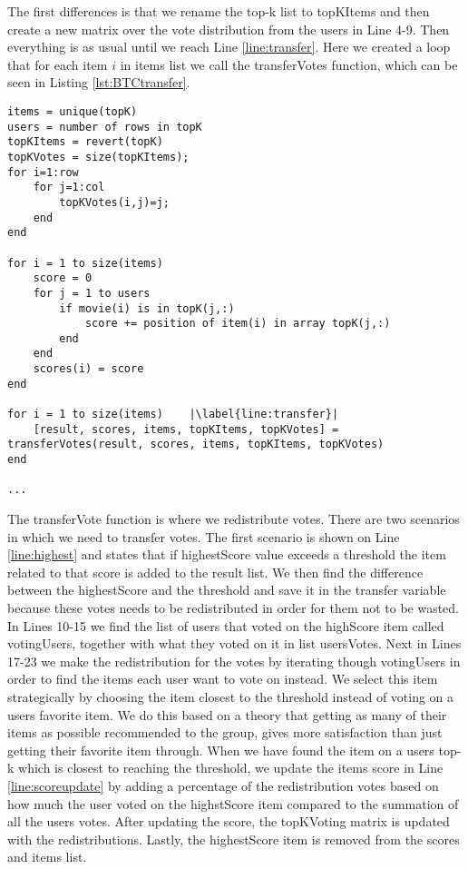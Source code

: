 The first differences is that we rename the top-k list to topKItems and then create a new matrix over the vote distribution from the users in Line 4-9. Then everything is as usual until we reach Line \ref{line:transfer}. Here we created a loop that for each item $i$ in items list we call the transferVotes function, which can be seen in Listing \ref{lst:BTCtransfer}.


\begin{lstlisting}[caption={Borda transferable count implementation},label=lst:BTC,escapechar=|]
items = unique(topK)
users = number of rows in topK
topKItems = revert(topK)
topKVotes = size(topKItems);
for i=1:row
    for j=1:col
        topKVotes(i,j)=j;
    end 
end

for i = 1 to size(items)
	score = 0
	for j = 1 to users
		if movie(i) is in topK(j,:)
			score += position of item(i) in array topK(j,:)
		end
	end
	scores(i) = score
end

for i = 1 to size(items)	|\label{line:transfer}|
	[result, scores, items, topKItems, topKVotes] = transferVotes(result, scores, items, topKItems, topKVotes)
end
	
...
\end{lstlisting}

The transferVote function is where we redistribute votes. There are two scenarios in which we need to transfer votes. The first scenario is shown on Line \ref{line:highest} and states that if highestScore value exceeds a threshold the item related to that score is added to the result list. We then find the difference between the highestScore and the threshold and save it in the transfer variable because these votes needs to be redistributed in order for them not to be wasted. In Lines 10-15 we find the list of users that voted on the highScore item  called votingUsers, together with what they voted on it in list usersVotes. Next in Lines 17-23 we make the redistribution for the votes by iterating though votingUsers in order to find the items each user want to vote on instead. We select this item strategically by choosing the item closest to the threshold instead of voting on a users favorite item. We do this based on a theory that getting as many of their items as possible recommended to the group, gives more satisfaction than just getting their favorite item through. When we have found the item on a users top-k which is closest to reaching the threshold, we update the items score in Line \ref{line:scoreupdate} by adding a percentage of the redistribution votes based on how much the user voted on the highstScore item compared to the summation of all the users votes. After updating the score, the topKVoting matrix is updated with the redistributions. Lastly, the highestScore item is removed from the scores and items list. 


